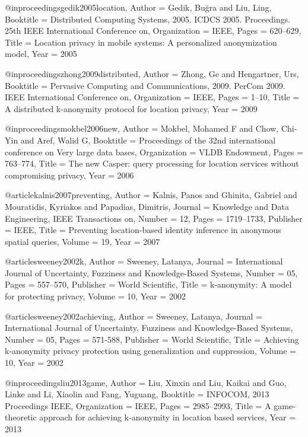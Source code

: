 @inproceedings{gedik2005location,
	Author = {Gedik, Bu{\u{g}}ra and Liu, Ling},
	Booktitle = {Distributed Computing Systems, 2005. ICDCS 2005. Proceedings. 25th IEEE International Conference on},
	Organization = {IEEE},
	Pages = {620--629},
	Title = {Location privacy in mobile systems: A personalized anonymization model},
	Year = {2005}}

@inproceedings{zhong2009distributed,
	Author = {Zhong, Ge and Hengartner, Urs},
	Booktitle = {Pervasive Computing and Communications, 2009. PerCom 2009. IEEE International Conference on},
	Organization = {IEEE},
	Pages = {1--10},
	Title = {A distributed k-anonymity protocol for location privacy},
	Year = {2009}}

@inproceedings{mokbel2006new,
	Author = {Mokbel, Mohamed F and Chow, Chi-Yin and Aref, Walid G},
	Booktitle = {Proceedings of the 32nd international conference on Very large data bases},
	Organization = {VLDB Endowment},
	Pages = {763--774},
	Title = {The new Casper: query processing for location services without compromising privacy},
	Year = {2006}}

@article{kalnis2007preventing,
	Author = {Kalnis, Panos and Ghinita, Gabriel and Mouratidis, Kyriakos and Papadias, Dimitris},
	Journal = {Knowledge and Data Engineering, IEEE Transactions on},
	Number = {12},
	Pages = {1719--1733},
	Publisher = {IEEE},
	Title = {Preventing location-based identity inference in anonymous spatial queries},
	Volume = {19},
	Year = {2007}}


@article{sweeney2002k,
	Author = {Sweeney, Latanya},
	Journal = {International Journal of Uncertainty, Fuzziness and Knowledge-Based Systems},
	Number = {05},
	Pages = {557--570},
	Publisher = {World Scientific},
	Title = {k-anonymity: A model for protecting privacy},
	Volume = {10},
	Year = {2002}}

@article{sweeney2002achieving,
	Author = {Sweeney, Latanya},
	Journal = {International Journal of Uncertainty, Fuzziness and Knowledge-Based Systems},
	Number = {05},
	Pages = {571-588},
	Publisher = {World Scientific},
	Title = {Achieving k-anonymity privacy protection using generalization and suppression},
	Volume = {10},
	Year = {2002}}

@inproceedings{liu2013game,
	Author = {Liu, Xinxin and Liu, Kaikai and Guo, Linke and Li, Xiaolin and Fang, Yuguang},
	Booktitle = {INFOCOM, 2013 Proceedings IEEE},
	Organization = {IEEE},
	Pages = {2985--2993},
	Title = {A game-theoretic approach for achieving k-anonymity in location based services},
	Year = {2013}}

